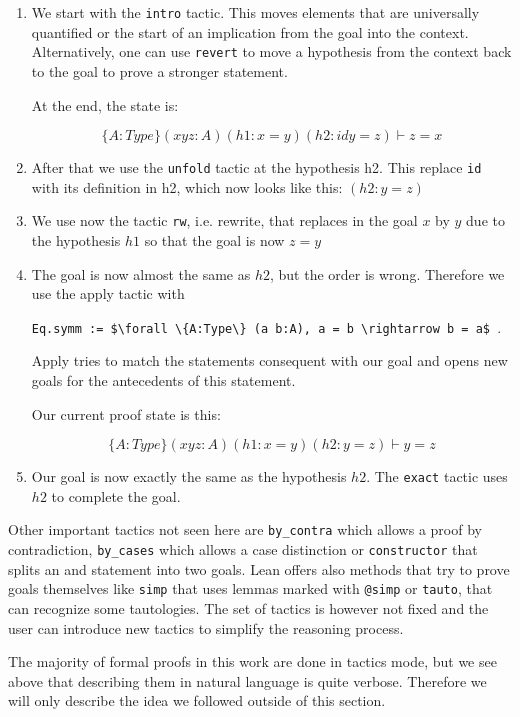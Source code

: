 \begin{enumerate}
    \item We start with the \lstinline|intro| tactic. This moves elements that are universally quantified or the start of an implication from the goal into the context. Alternatively, one can use \lstinline|revert| to move a hypothesis from the context back to the goal to prove a stronger statement.
    
    At the end, the state is: 

    \[ \{A:Type\} (x y z: A) (h1: x = y) (h2: id y = z)\vdash z = x\]

    \item After that we use the \lstinline|unfold| tactic at the hypothesis h2. This replace \lstinline|id| with its definition in h2, which now looks like this: $(h2: y = z)$
    
    \item We use now the tactic \lstinline|rw|, i.e. rewrite, that replaces in the goal $x$ by $y$ due to the hypothesis $h1$ so that the goal is now $z = y$
    \item The goal is now almost the same as $h2$, but the order is wrong. Therefore we use the apply tactic with
    
    \lstinline|Eq.symm := $\forall \{A:Type\} (a b:A), a = b \rightarrow b = a$ |. 

    Apply tries to match the statements consequent with our goal and opens new goals for the antecedents of this statement.

    Our current proof state is this:

    \[ \{A:Type\} (x y z: A) (h1: x = y) (h2: y = z)\vdash y = z\]

    \item Our goal is now exactly the same as the hypothesis $h2$. The \lstinline|exact| tactic uses $h2$ to complete the goal.
\end{enumerate}

Other important tactics not seen here are \lstinline|by_contra| which allows a proof by contradiction, \lstinline|by_cases| which allows a case distinction or \lstinline|constructor| that splits an and statement into two goals. Lean offers also methods that try to prove goals themselves like \lstinline|simp| that uses lemmas marked with \lstinline|@simp| or \lstinline|tauto|, that can recognize some tautologies. The set of tactics is however not fixed and the user can introduce new tactics to simplify the reasoning process.

The majority of formal proofs in this work are done in tactics mode, but we see above that describing them in natural language is quite verbose. Therefore we will only describe the idea we followed outside of this section.

